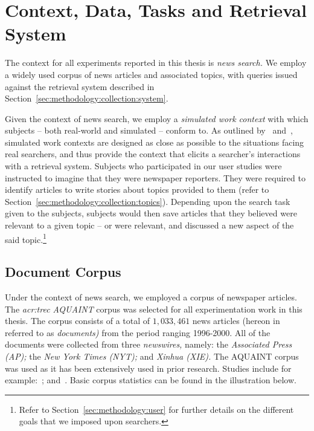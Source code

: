 
\section{Context, Data, Tasks and Retrieval System}\label{sec:methodology:collection}
The context for all experiments reported in this thesis is \emph{news search.} We employ a widely used corpus of news articles and associated topics, with queries issued against the retrieval system described in Section~\ref{sec:methodology:collection:system}.

Given the context of news search, we employ a \emph{simulated work context} with which subjects -- both real-world and simulated -- conform to. As outlined by~\cite{borlund2000simulated_work_tasks} and~\cite{li2013simulated_work_tasks}, simulated work contexts are designed as close as possible to the situations facing real searchers, and thus provide the context that elicits a searcher's interactions with a retrieval system. Subjects who participated in our user studies were instructed to imagine that they were newspaper reporters. They were required to identify articles to write stories about topics provided to them (refer to Section~\ref{sec:methodology:collection:topics}). Depending upon the search task given to the subjects, subjects would then save articles that they believed were relevant to a given topic -- or were relevant, and discussed a new aspect of the said topic.\footnote{Refer to Section~\ref{sec:methodology:user} for further details on the different goals that we imposed upon searchers.}

\subsection{Document Corpus}\label{sec:methodology:collection:corpus}
Under the context of news search, we employed a corpus of newspaper articles. The \emph{\gls{acr:trec} AQUAINT} corpus was selected for all experimentation work in this thesis. The corpus consists of a total of $1,033,461$ news articles (hereon in referred to as \emph{documents)} from the period ranging 1996-2000. All of the documents were collected from three \emph{newswires,} namely: the \emph{Associated Press (AP);} the \emph{New York Times (NYT);} and \emph{Xinhua (XIE).} The AQUAINT corpus was used as it has been extensively used in prior research. Studies include for example:~\cite{collinsthompson2004retrieval_quality, ofoghi2006passage_retrieval, baillie2006query_sampling, azzopardi2008retrievability, kelly2009user_study, azzopardi2013query_cost, maxwell2014temporal_delays, harvey2017searching, yang2017can}; and~\cite{wilkie2017bias}. Basic corpus statistics can be found in the illustration below.

